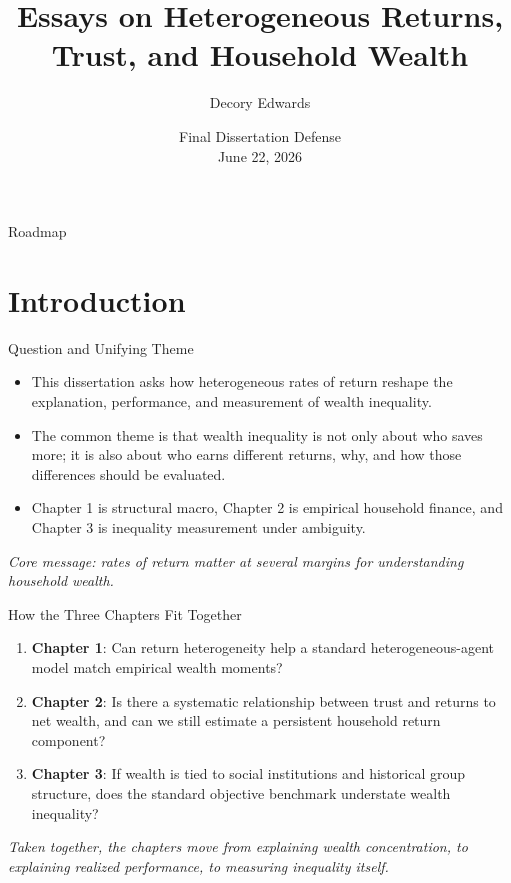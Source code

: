 \documentclass{beamer}
\title[Dissertation Defense]{Essays on Heterogeneous Returns, Trust, and Household Wealth}
\author[Edwards]{Decory Edwards}
\institute[JHU]{Johns Hopkins University}
\date[June 22, 2026]{Final Dissertation Defense \\ June 22, 2026}
\begin{document}
\begin{frame}
  \titlepage
\end{frame}

\begin{frame}{Roadmap}
  \tableofcontents[hideallsubsections]
\end{frame}

\section{Introduction}

\begin{frame}{Question and Unifying Theme}
  \begin{itemize}
    \item This dissertation asks how heterogeneous rates of return reshape the explanation, performance, and measurement of wealth inequality.
    \item The common theme is that wealth inequality is not only about who saves more; it is also about who earns different returns, why, and how those differences should be evaluated.
    \item Chapter 1 is structural macro, Chapter 2 is empirical household finance, and Chapter 3 is inequality measurement under ambiguity.
  \end{itemize}

  \vspace{0.5em}
  \textit{Core message: rates of return matter at several margins for understanding household wealth.}
\end{frame}

\begin{frame}{How the Three Chapters Fit Together}
  \begin{enumerate}
    \item \textbf{Chapter 1}: Can return heterogeneity help a standard heterogeneous-agent model match empirical wealth moments?
    \item \textbf{Chapter 2}: Is there a systematic relationship between trust and returns to net wealth, and can we still estimate a persistent household return component?
    \item \textbf{Chapter 3}: If wealth is tied to social institutions and historical group structure, does the standard objective benchmark understate wealth inequality?
  \end{enumerate}

  \vspace{0.6em}
  \textit{Taken together, the chapters move from explaining wealth concentration, to explaining realized performance, to measuring inequality itself.}
\end{frame}
\end{document}
